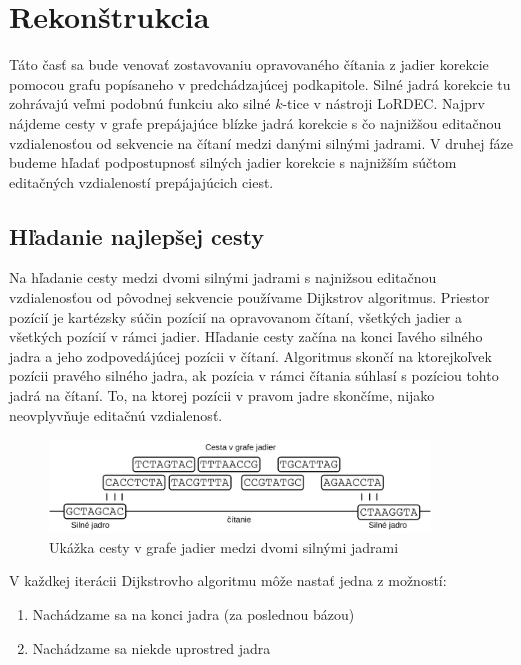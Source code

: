 \section{Rekonštrukcia}

Táto časť sa bude venovať zostavovaniu opravovaného čítania z jadier korekcie pomocou grafu popísaneho v predchádzajúcej podkapitole. Silné jadrá korekcie tu zohrávajú veľmi podobnú funkciu ako silné $k$-tice v nástroji LoRDEC. Najprv nájdeme cesty v grafe prepájajúce blízke jadrá korekcie s čo najnižšou editačnou vzdialenosťou od sekvencie na čítaní medzi danými silnými jadrami. V druhej fáze budeme hľadať podpostupnosť silných jadier korekcie s najnižším súčtom editačných vzdialeností prepájajúcich ciest.

\subsection{Hľadanie najlepšej cesty}

Na hľadanie cesty medzi dvomi silnými jadrami s najnižsou editačnou vzdialenosťou od pôvodnej sekvencie používame Dijkstrov algoritmus. Priestor pozícií je kartézsky súčin pozícií na opravovanom čítaní, všetkých jadier a všetkých pozícií v rámci jadier. Hľadanie cesty začína na konci ľavého silného jadra a jeho zodpovedájúcej pozícii v čítaní. Algoritmus skončí na ktorejkoľvek pozícii pravého silného jadra, ak pozícia v rámci čítania súhlasí s pozíciou tohto jadrá na čítaní. To, na ktorej pozícii v pravom jadre skončíme, nijako neovplyvňuje editačnú vzdialenosť.

\begin{figure}
    \centering
    \includegraphics[width=0.9\textwidth]{images/recreating_path.png}
    \caption{Ukážka cesty v grafe jadier medzi dvomi silnými jadrami}
    \label{fig:recreating_path}
\end{figure} 

V každkej iterácii Dijkstrovho algoritmu môže nastať jedna z možností:
\begin{enumerate}[label={S.\arabic*}]
\item \label{na_konci_jadra} Nachádzame sa na konci jadra (za poslednou bázou)
\item \label{uprostred_jadra} Nachádzame sa niekde uprostred jadra
\end{enumerate}


